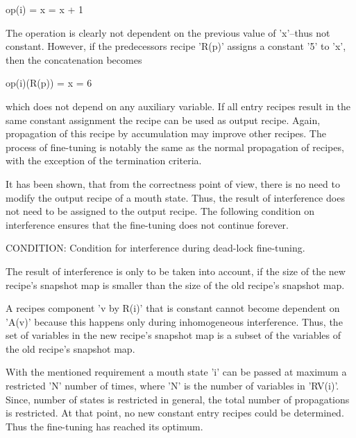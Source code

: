 \documentclass[12pt]{article}
\begin{document}
                       op(i) = { x = x + 1 }

The operation is clearly not dependent on the previous value of 'x'--thus not
constant. However, if the predecessors recipe 'R(p)' assigns a constant '5' to
'x', then the concatenation becomes

                       op(i)(R(p)) = { x = 6 }

which does not depend on any auxiliary variable. If all entry recipes result in
the same constant assignment the recipe can be used as output recipe. Again,
propagation of this recipe by accumulation may improve other recipes. The process
of fine-tuning is notably the same as the normal propagation of recipes, with 
the exception of the termination criteria.

It has been shown, that from the correctness point of view, there is no need to
modify the output recipe of a mouth state. Thus, the result of interference
does not need to be assigned to the output recipe. The following condition 
on interference ensures that the fine-tuning does not continue forever.

CONDITION: Condition for interference during dead-lock fine-tuning.

    The result of interference is only to be taken into account, if the
    size of the new recipe's snapshot map is smaller than the size of 
    the old recipe's snapshot map. 

A recipes component 'v by R(i)' that is constant cannot become dependent on
'A(v)' because this happens only during inhomogeneous interference. Thus, the
set of variables in the new recipe's snapshot map is a subset of the variables
of the old recipe's snapshot map.

With the mentioned requirement a mouth state 'i' can be passed at maximum a
restricted 'N' number of times, where 'N' is the number of variables in
'RV(i)'. Since, number of states is restricted in general, the total number of
propagations is restricted. At that point, no new constant entry recipes could
be determined. Thus the fine-tuning has reached its optimum.
\end{document}
